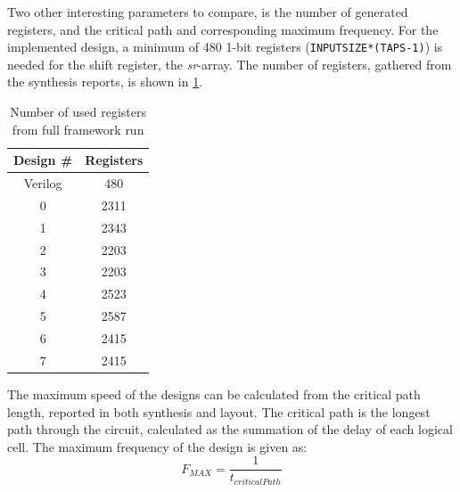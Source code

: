 Two other interesting parameters to compare, is the number of generated registers, and the critical path and corresponding maximum frequency. For the implemented design, a minimum of 480 1-bit registers (\verb!INPUTSIZE*(TAPS-1)!) is needed for the shift register, the \textit{sr}-array. The number of registers, gathered from the synthesis reports, is shown in \cref{tab:resultregistercount}. 

\begin{table}[hbtp]
    \centering
    \begin{tabular}{cc}
    \textbf{Design \#} & \textbf{Registers} \\
    \toprule
    Verilog & 480 \\
    0 & 2311 \\
    1 & 2343 \\
    2 & 2203 \\
    3 & 2203 \\
    4 & 2523 \\
    5 & 2587 \\
    6 & 2415 \\
    7 & 2415 \\
    \bottomrule
    \end{tabular}
    \caption{Number of used registers from full framework run}
    \label{tab:resultregistercount}
\end{table}
The maximum speed of the designs can be calculated from the critical path length, reported in both synthesis and layout. The critical path is the longest path through the circuit, calculated as the summation of the delay of each logical cell. The maximum frequency of the design is given as:
\begin{equation}
   F_{MAX} = \frac{1}{t_{criticalPath}}
\end{equation}


